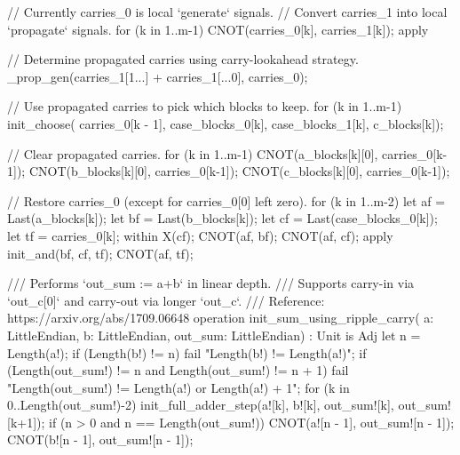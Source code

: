 \documentclass[onecolumn,unpublished]{quantumarticle}
\theoremstyle{definition}
\theoremstyle{definition}
\theoremstyle{definition}
\begin{document}
\begin{qsharp}
{{{{                // Currently carries_0 is local `generate` signals.
                // Convert carries_1 into local `propagate` signals.
                for (k in 1..m-1) {
                    CNOT(carries_0[k], carries_1[k]);
                }
            } apply {
                // Determine propagated carries using carry-lookahead strategy.
                _prop_gen(carries_1[1...] + carries_1[...0], carries_0);

                // Use propagated carries to pick which blocks to keep.
                for (k in 1..m-1) {
                    init_choose(
                        carries_0[k - 1],
                        case_blocks_0[k],
                        case_blocks_1[k],
                        c_blocks[k]);
                }

                // Clear propagated carries.
                for (k in 1..m-1) {
                    CNOT(a_blocks[k][0], carries_0[k-1]);
                    CNOT(b_blocks[k][0], carries_0[k-1]);
                    CNOT(c_blocks[k][0], carries_0[k-1]);
                }

                // Restore carries_0 (except for carries_0[0] left zero).
                for (k in 1..m-2) {
                    let af = Last(a_blocks[k]);
                    let bf = Last(b_blocks[k]);
                    let cf = Last(case_blocks_0[k]);
                    let tf = carries_0[k];
                    within {
                        X(cf);
                        CNOT(af, bf);
                        CNOT(af, cf);
                    } apply {
                        init_and(bf, cf, tf);
                        CNOT(af, tf);
                    }
                }
            }
        }
    }

    /// Performs `out_sum := a+b` in linear depth.
    /// Supports carry-in via `out_c[0]` and carry-out via longer `out_c`.
    /// Reference: https://arxiv.org/abs/1709.06648
    operation init_sum_using_ripple_carry(
            a: LittleEndian,
            b: LittleEndian,
            out_sum: LittleEndian) : Unit is Adj {
        let n = Length(a!);
        if (Length(b!) != n) {
            fail "Length(b!) != Length(a!)";
        }
        if (Length(out_sum!) != n and Length(out_sum!) != n + 1) {
            fail "Length(out_sum!) != Length(a!) or Length(a!) + 1";
        }
        for (k in 0..Length(out_sum!)-2) {
            init_full_adder_step(a![k], b![k], out_sum![k], out_sum![k+1]);
        }
        if (n > 0 and n == Length(out_sum!)) {
            CNOT(a![n - 1], out_sum![n - 1]);
            CNOT(b![n - 1], out_sum![n - 1]);
        }
    }

}
\end{qsharp}
\end{document}
